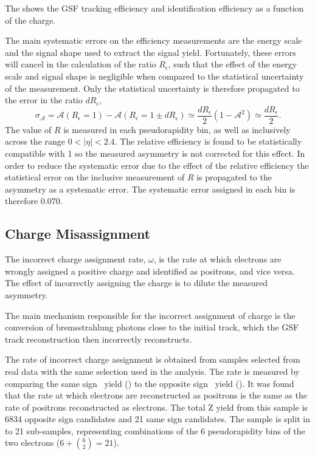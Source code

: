 The  shows the GSF tracking efficiency and identification 
efficiency as a function of the charge.


The main systematic errors on the efficiency measurements are the energy scale
and the signal shape used to extract the signal yield. Fortunately, these
errors will cancel in the calculation of the ratio $R_\epsilon$, such that the
effect of the energy scale and signal shape is negligible
when compared to the statistical uncertainty of the measurement. Only the
statistical uncertainty is therefore propagated to the error in the ratio
$dR_\epsilon$,
\begin{equation}
  \label{eq:releff}
  \sigma_{\mathcal{A}} 
  = \mathcal{A}(R_\epsilon=1) - \mathcal{A}(R_\epsilon=1\pm dR_\epsilon)  
  \simeq \frac{dR_\epsilon}{2}(1-\mathcal{A}^2)
  \simeq \frac{dR_\epsilon}{2} .
\end{equation}
The value of $R$ is measured in each pseudorapidity bin, as well as inclusively
across the range $0<| \eta |< 2.4$. 
The relative efficiency is found to be statistically compatible with 1 so the
measured asymmetry is not corrected for this effect.
In order to reduce the systematic error due to the effect of the relative
efficiency the statistical error on the inclusive measurement of $R$ is
propagated to the asymmetry as a systematic error. The systematic error assigned
in each bin is therefore $0.070$.

\subsection{Charge Misassignment}

The incorrect charge assignment rate, $\omega$, is the rate at which electrons are
wrongly assigned a positive charge and identified as positrons, and vice versa.
The effect of incorrectly assigning the charge is to dilute the measured
asymmetry.

The main mechanism responsible for the incorrect assignment of charge is the
conversion of bremsstrahlung photons close to the initial track, which the GSF
track reconstruction then incorrectly reconstructs.

The rate of incorrect charge assignment is obtained from \Zee samples selected from
real data  with the same selection used in the analysis. 
The rate is measured by comparing the
same sign \PZ\ yield (\HepProcess{\PZ\to\Pepm\Pepm}) to the opposite sign \PZ\
yield (\HepProcess{\PZ\to\Pepm\Pemp}).
It was found that the rate at which electrons are reconstructed as positrons is
the same as the rate of positrons reconstructed as electrons.
The total Z yield from this sample is 6834 opposite sign \PZ candidates and 21
same sign \PZ candidates.
The sample is split in to 21 sub-samples, representing
combinations of the 6 pseudorapidity bins of the two electrons ($6+\binom{6}{2} =
21$).

